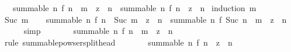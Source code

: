 \begin{isabellebody}
\ \ \ {\isachardoublequoteopen}summable\ {\isacharparenleft}{\kern0pt}{\isasymlambda}n{\isachardot}{\kern0pt}\ f\ {\isacharparenleft}{\kern0pt}n\ {\isacharplus}{\kern0pt}\ m{\isacharparenright}{\kern0pt}\ {\isacharasterisk}{\kern0pt}\ z\ {\isacharcircum}{\kern0pt}\ n{\isacharparenright}{\kern0pt}\ {\isasymlongleftrightarrow}\ summable\ {\isacharparenleft}{\kern0pt}{\isasymlambda}n{\isachardot}{\kern0pt}\ f\ n\ {\isacharasterisk}{\kern0pt}\ z\ {\isacharcircum}{\kern0pt}\ n{\isacharparenright}{\kern0pt}{\isachardoublequoteclose}\isanewline
%
\isadelimproof
%
\endisadelimproof
%
\isatagproof
{}\isamarkupfalse%
\ {\isacharparenleft}{\kern0pt}induction\ m{\isacharparenright}{\kern0pt}\isanewline
\ \ \isamarkupfalse%
\ {\isacharparenleft}{\kern0pt}Suc\ m{\isacharparenright}{\kern0pt}\isanewline
\ \ \isamarkupfalse%
\ {\isachardoublequoteopen}summable\ {\isacharparenleft}{\kern0pt}{\isasymlambda}n{\isachardot}{\kern0pt}\ f\ {\isacharparenleft}{\kern0pt}n\ {\isacharplus}{\kern0pt}\ Suc\ m{\isacharparenright}{\kern0pt}\ {\isacharasterisk}{\kern0pt}\ z\ {\isacharcircum}{\kern0pt}\ n{\isacharparenright}{\kern0pt}\ {\isacharequal}{\kern0pt}\ summable\ {\isacharparenleft}{\kern0pt}{\isasymlambda}n{\isachardot}{\kern0pt}\ f\ {\isacharparenleft}{\kern0pt}Suc\ n\ {\isacharplus}{\kern0pt}\ m{\isacharparenright}{\kern0pt}\ {\isacharasterisk}{\kern0pt}\ z\ {\isacharcircum}{\kern0pt}\ n{\isacharparenright}{\kern0pt}{\isachardoublequoteclose}\isanewline
\ \ \ \ \isamarkupfalse%
\ simp\isanewline
\ \ \isamarkupfalse%
\ \isamarkupfalse%
\ {\isachardoublequoteopen}{\isasymdots}\ {\isacharequal}{\kern0pt}\ summable\ {\isacharparenleft}{\kern0pt}{\isasymlambda}n{\isachardot}{\kern0pt}\ f\ {\isacharparenleft}{\kern0pt}n\ {\isacharplus}{\kern0pt}\ m{\isacharparenright}{\kern0pt}\ {\isacharasterisk}{\kern0pt}\ z\ {\isacharcircum}{\kern0pt}\ n{\isacharparenright}{\kern0pt}{\isachardoublequoteclose}\isanewline
\ \ \ \ \isamarkupfalse%
\ {\isacharparenleft}{\kern0pt}rule\ summable{\isacharunderscore}{\kern0pt}powser{\isacharunderscore}{\kern0pt}split{\isacharunderscore}{\kern0pt}head{\isacharparenright}{\kern0pt}\isanewline
\ \ \isamarkupfalse%
\ \isamarkupfalse%
\ {\isachardoublequoteopen}{\isasymdots}\ {\isacharequal}{\kern0pt}\ summable\ {\isacharparenleft}{\kern0pt}{\isasymlambda}n{\isachardot}{\kern0pt}\ f\ n\ {\isacharasterisk}{\kern0pt}\ z\ {\isacharcircum}{\kern0pt}\ n{\isacharparenright}{\kern0pt}{\isachardoublequoteclose}\isanewline

\end{isabellebody}
